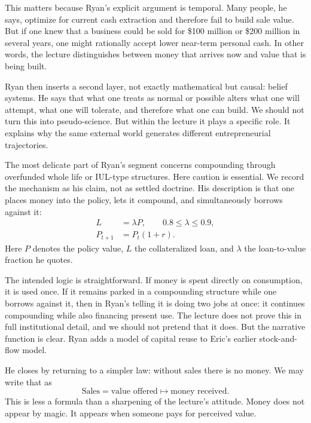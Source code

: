 This matters because Ryan's explicit argument is temporal. Many people, he says, optimize for current cash extraction and therefore fail to build sale value. But if one knew that a business could be sold for \$100 million or \$200 million in several years, one might rationally accept lower near-term personal cash. In other words, the lecture distinguishes between money that arrives now and value that is being built.

Ryan then inserts a second layer, not exactly mathematical but causal: belief systems. He says that what one treats as normal or possible alters what one will attempt, what one will tolerate, and therefore what one can build. We should not turn this into pseudo-science. But within the lecture it plays a specific role. It explains why the same external world generates different entrepreneurial trajectories.

The most delicate part of Ryan's segment concerns compounding through overfunded whole life or IUL-type structures. Here caution is essential. We record the mechanism as his claim, not as settled doctrine. His description is that one places money into the policy, lets it compound, and simultaneously borrows against it:
\begin{align}
L &= \lambda P,\qquad 0.8 \le \lambda \le 0.9,\\
P_{t+1} &= P_t(1+r).
\end{align}
Here \(P\) denotes the policy value, \(L\) the collateralized loan, and \(\lambda\) the loan-to-value fraction he quotes.

The intended logic is straightforward. If money is spent directly on consumption, it is used once. If it remains parked in a compounding structure while one borrows against it, then in Ryan's telling it is doing two jobs at once: it continues compounding while also financing present use. The lecture does not prove this in full institutional detail, and we should not pretend that it does. But the narrative function is clear. Ryan adds a model of capital reuse to Eric's earlier stock-and-flow model.

He closes by returning to a simpler law: without sales there is no money. We may write that as
\begin{equation}
\text{Sales} = \text{value offered} \mapsto \text{money received}.
\end{equation}
This is less a formula than a sharpening of the lecture's attitude. Money does not appear by magic. It appears when someone pays for perceived value.

